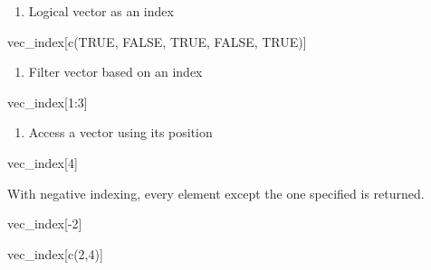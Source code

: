 \documentclass[
  letterpaper,
  DIV=11,
  numbers=noendperiod]{scrreprt}
\newenvironment{Shaded}{}{}
\newcommand{\ConstantTok}[1]{\textcolor[rgb]{0.00,0.36,0.77}{#1}}
\newcommand{\DecValTok}[1]{\textcolor[rgb]{0.00,0.36,0.77}{#1}}
\newcommand{\FunctionTok}[1]{\textcolor[rgb]{0.44,0.26,0.76}{#1}}
\newcommand{\NormalTok}[1]{\textcolor[rgb]{0.14,0.16,0.18}{#1}}
\newcommand{\SpecialCharTok}[1]{\textcolor[rgb]{0.00,0.36,0.77}{#1}}
\providecommand{\tightlist}{%
  \setlength{\itemsep}{0pt}\setlength{\parskip}{0pt}}\usepackage{longtable,booktabs,array}
\begin{document}
\begin{enumerate}
\def\labelenumi{\alph{enumi})}
\tightlist
\item
  Logical vector as an index
\end{enumerate}

\begin{Shaded}
\begin{Highlighting}[]
\NormalTok{vec\_index[}\FunctionTok{c}\NormalTok{(}\ConstantTok{TRUE}\NormalTok{, }\ConstantTok{FALSE}\NormalTok{, }\ConstantTok{TRUE}\NormalTok{, }\ConstantTok{FALSE}\NormalTok{, }\ConstantTok{TRUE}\NormalTok{)]}
\end{Highlighting}
\end{Shaded}

\begin{enumerate}
\def\labelenumi{\alph{enumi})}
\setcounter{enumi}{1}
\tightlist
\item
  Filter vector based on an index
\end{enumerate}

\begin{Shaded}
\begin{Highlighting}[]
\NormalTok{vec\_index[}\DecValTok{1}\SpecialCharTok{:}\DecValTok{3}\NormalTok{]}
\end{Highlighting}
\end{Shaded}

\begin{enumerate}
\def\labelenumi{\alph{enumi})}
\setcounter{enumi}{2}
\tightlist
\item
  Access a vector using its position
\end{enumerate}

\begin{Shaded}
\begin{Highlighting}[]
\NormalTok{vec\_index[}\DecValTok{4}\NormalTok{]}
\end{Highlighting}
\end{Shaded}

With negative indexing, every element except the one specified is
returned.

\begin{Shaded}
\begin{Highlighting}[]
\NormalTok{vec\_index[}\SpecialCharTok{{-}}\DecValTok{2}\NormalTok{]}
\end{Highlighting}
\end{Shaded}

\begin{Shaded}
\begin{Highlighting}[]
\NormalTok{vec\_index[}\FunctionTok{c}\NormalTok{(}\DecValTok{2}\NormalTok{,}\DecValTok{4}\NormalTok{)]}
\end{Highlighting}
\end{Shaded}
\end{document}
